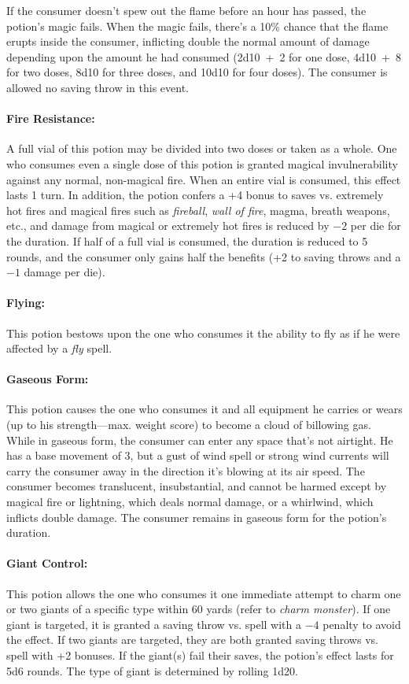 \begin{multicols}{2}
If the consumer doesn't spew out the flame before an hour has passed, the potion's magic fails.  When the magic fails, there's a 10\% chance that the flame erupts inside the consumer, inflicting double the normal amount of damage depending upon the amount he had consumed (2d10~+~2 for one dose, 4d10~+~8 for two doses, 8d10 for three doses, and 10d10 for four doses).  The consumer is allowed no saving throw in this event.
 
\paragraph{Fire Resistance:} A full vial of this potion may be divided into two doses or taken as a whole.  One who consumes even a single dose of this potion is granted magical invulnerability against any normal, non-magical fire.  When an entire vial is consumed, this effect lasts 1 turn.  In addition, the potion confers a +4 bonus to saves vs. extremely hot fires and magical fires such as \textit{fireball}, \textit{wall of fire}, magma, breath weapons, etc., and damage from magical or extremely hot fires is reduced by $-2$ per die for the duration.  If half of a full vial is consumed, the duration is reduced to 5 rounds, and the consumer only gains half the benefits (+2 to saving throws and a $-1$ damage per die).

\paragraph{Flying:} This potion bestows upon the one who consumes it the ability to fly as if he were affected by a \textit{fly} spell.

\paragraph{Gaseous Form:} This potion causes the one who consumes it and all equipment he carries or wears (up to his strength---max. weight score) to become a cloud of billowing gas.  While in gaseous form, the consumer can enter any space that's not airtight.  He has a base movement of 3, but a gust of wind spell or strong wind currents will carry the consumer away in the direction it's blowing at its air speed.  The consumer becomes translucent, insubstantial, and cannot be harmed except by magical fire or lightning, which deals normal damage, or a whirlwind, which inflicts double damage.  The consumer remains in gaseous form for the potion's duration.

\paragraph{Giant Control:} This potion allows the one who consumes it one immediate attempt to charm one or two giants of a specific type within 60 yards (refer to \textit{charm monster}).  If one giant is targeted, it is granted a saving throw vs. spell with a $-4$ penalty to avoid the effect.  If two giants are targeted, they are both granted saving throws vs. spell with +2 bonuses.  If the giant(s) fail their saves, the potion's effect lasts for 5d6 rounds.  The type of giant is determined by rolling 1d20. 
 

\end{multicols}
